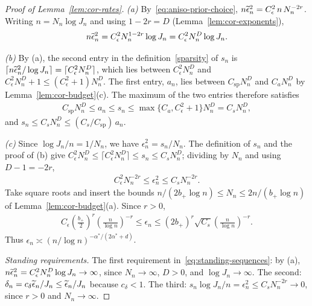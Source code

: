 \begin{proof}[Proof of Lemma~\ref{lem:cor-rates}]
\emph{(a)} By~\eqref{eq:aniso-prior-choice}, $n\widetilde{\epsilon}_n^2=C_\epsilon^2\,n\,N_n^{-2r}$. Writing $n=N_n\log J_n$ and using $1-2r=D$ (Lemma~\ref{lem:cor-exponents}),
\begin{align*}
n\widetilde{\epsilon}_n^2=C_\epsilon^2N_n^{1-2r}\log J_n=C_\epsilon^2N_n^D\log J_n.
\end{align*}

\emph{(b)} By (a), the second entry in the definition~\eqref{sparsity} of $s_n$ is $\lceil n\widetilde{\epsilon}_n^2/\log J_n\rceil=\lceil C_\epsilon^2N_n^D\rceil$, which lies between $C_\epsilon^2N_n^D$ and $C_\epsilon^2N_n^D+1\leq(C_\epsilon^2+1)N_n^D$. The first entry, $a_n$, lies between $C_{\mathrm{sp}}N_n^D$ and $C_aN_n^D$ by Lemma~\ref{lem:cor-budget}(c). The maximum of the two entries therefore satisfies
\begin{align*}
C_{\mathrm{sp}}N_n^D\leq a_n\leq s_n\leq\max\{C_a,C_\epsilon^2+1\}N_n^D=C_sN_n^D,
\end{align*}
and $s_n\leq C_sN_n^D\leq(C_s/C_{\mathrm{sp}})\,a_n$.

\emph{(c)} Since $\log J_n/n=1/N_n$, we have $\epsilon_n^2=s_n/N_n$. The definition of $s_n$ and the proof of (b) give $C_\epsilon^2N_n^D\leq\lceil C_\epsilon^2N_n^D\rceil\leq s_n\leq C_sN_n^D$; dividing by $N_n$ and using $D-1=-2r$,
\begin{align*}
C_\epsilon^2N_n^{-2r}\leq\epsilon_n^2\leq C_sN_n^{-2r}.
\end{align*}
Take square roots and insert the bounds $n/(2b_+\log n)\leq N_n\leq2n/(b_+\log n)$ of Lemma~\ref{lem:cor-budget}(a). Since $r>0$,
\begin{align*}
C_\epsilon\left(\frac{b_+}{2}\right)^r\left(\frac n{\log n}\right)^{-r}
\leq\epsilon_n
\leq(2b_+)^r\sqrt{C_s}\left(\frac n{\log n}\right)^{-r}.
\end{align*}
Thus $\epsilon_n\asymp(n/\log n)^{-\alpha^*/(2\alpha^*+d)}$.

\emph{Standing requirements.} The first requirement in~\eqref{eq:standing-sequences}: by (a), $n\widetilde{\epsilon}_n^2=C_\epsilon^2N_n^D\log J_n\to\infty$, since $N_n\to\infty$, $D>0$, and $\log J_n\to\infty$. The second: $\delta_n=c_\delta\widetilde{\epsilon}_n/J_n\leq\widetilde{\epsilon}_n/J_n$ because $c_\delta<1$. The third: $s_n\log J_n/n=\epsilon_n^2\leq C_sN_n^{-2r}\to0$, since $r>0$ and $N_n\to\infty$.
\end{proof}
